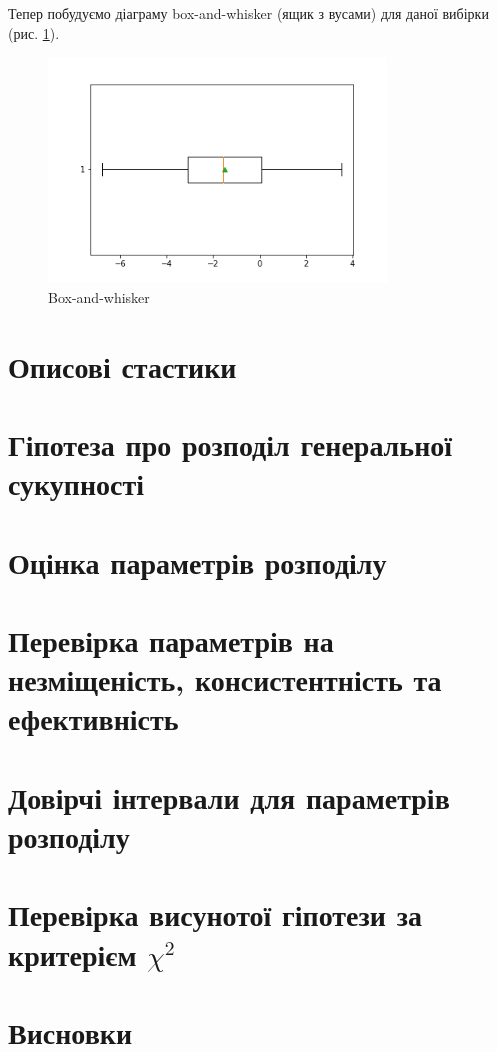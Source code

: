 \documentclass[14pt, a4paper, ukrainian]{extreport}
\begin{document}
	Тепер побудуємо діаграму box-and-whisker (ящик з вусами) для даної вибірки (рис. \ref{im:box_and_whisker}).
		\begin{figure}[H]
		\centering
		\includegraphics[width=0.8\textwidth]{./Image/Box_and_whisker.png}
		\caption{Box-and-whisker}
		\label{im:box_and_whisker}
	\end{figure}	
	
	\chapter{Описові стастики}
	
	
		
	\chapter{Гіпотеза про розподіл генеральної сукупності}
	\chapter{Оцінка параметрів розподілу}
	\chapter{Перевірка параметрів на незміщеність, консистентність та ефективність}
	\chapter{Довірчі інтервали для параметрів розподілу}
	\chapter{Перевірка висунотої гіпотези за критерієм $\chi^2$}
	\chapter*{Висновки}
	
	
\end{document}
